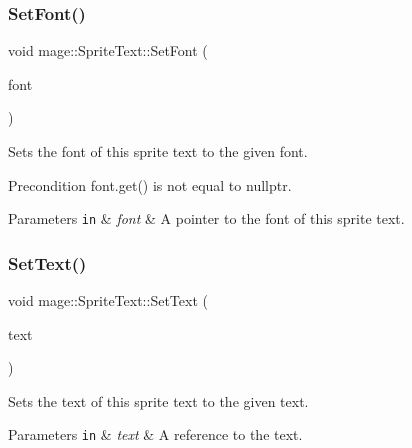 \subsubsection{\texorpdfstring{Set\+Font()}{SetFont()}}
{\footnotesize\ttfamily void mage\+::\+Sprite\+Text\+::\+Set\+Font (\begin{DoxyParamCaption}\item[{\hyperlink{namespacemage_a1e01ae66713838a7a67d30e44c67703e}{Shared\+Ptr}$<$ const \hyperlink{classmage_1_1_sprite_font}{Sprite\+Font} $>$}]{font }\end{DoxyParamCaption})\hspace{0.3cm}{\ttfamily [noexcept]}}

Sets the font of this sprite text to the given font.

\begin{DoxyPrecond}{Precondition}
{\ttfamily font.\+get()} is not equal to {\ttfamily nullptr}. 
\end{DoxyPrecond}

\begin{DoxyParams}[1]{Parameters}
\mbox{\tt in}  & {\em font} & A pointer to the font of this sprite text. \\
\hline
\end{DoxyParams}
\hypertarget{classmage_1_1_sprite_text_ac33e512ab29554a306ada9a378ab00eb}{}\label{classmage_1_1_sprite_text_ac33e512ab29554a306ada9a378ab00eb} 
\subsubsection{\texorpdfstring{Set\+Text()}{SetText()}\hspace{0.1cm}{\footnotesize\ttfamily [1/3]}}
{\footnotesize\ttfamily void mage\+::\+Sprite\+Text\+::\+Set\+Text (\begin{DoxyParamCaption}\item[{const wstring \&}]{text }\end{DoxyParamCaption})}

Sets the text of this sprite text to the given text.


\begin{DoxyParams}[1]{Parameters}
\mbox{\tt in}  & {\em text} & A reference to the text. \\
\hline
\end{DoxyParams}
\hypertarget{classmage_1_1_sprite_text_a03d5012e2812d422a1285a4a0abb104f}{}\label{classmage_1_1_sprite_text_a03d5012e2812d422a1285a4a0abb104f} 

